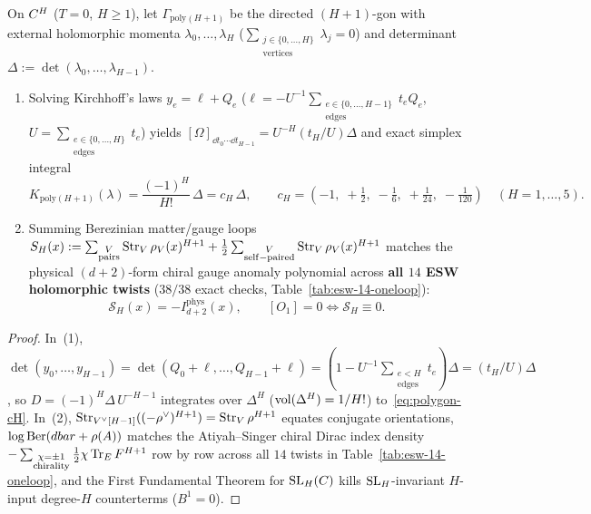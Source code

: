\begin{theorem}[Exact $(H+1)$-gon kernel and universal $14$-twist match $\mathcal{S}_H = -I^{\mathrm{phys}}_{d+2}$~{\cite{GW18,Repo9e833c8}}]
\label{thm:esw-oneloop}
On $C^H$ ($T = 0$, $H \ge 1$), let $\Gamma_{\mathrm{poly}(H+1)}$ be the directed $(H+1)$-gon with external holomorphic momenta $\lambda_0,\dots,\lambda_H$ ($\sum_{\substack{j\in\{0,\dots,H\}\\\mathrm{vertices}}}\lambda_j = 0$) and determinant $\Delta := \det(\lambda_0,\dots,\lambda_{H-1})$.
\begin{enumerate}[label=(\arabic*),leftmargin=*]
  \item Solving Kirchhoff's laws $y_e = \ell + Q_e$ ($\ell = -U^{-1}\sum_{\substack{e\in\{0,\dots,H-1\}\\\mathrm{edges}}}t_e Q_e$, $U = \sum_{\substack{e\in\{0,\dots,H\}\\\mathrm{edges}}}t_e$) yields $[\Omega]_{\dd t_0\cdots\dd t_{H-1}} = U^{-H}(t_H/U)\Delta$ and exact simplex integral
  \begin{equation}
  \label{eq:polygon-cH}
  K_{\mathrm{poly}(H+1)}(\lambda) = \frac{(-1)^H}{H!}\,\Delta = c_H\,\Delta,\qquad
  c_H = \left(-1,\; +\tfrac{1}{2},\; -\tfrac{1}{6},\; +\tfrac{1}{24},\; -\tfrac{1}{120}\right)\quad (H=1,\dots,5).
  \end{equation}
  \item Summing Berezinian matter/gauge loops $S_H(x) := \sum_{\substack{V\\\mathrm{pairs}}}\operatorname{Str}_V\rho_V(x)^{H+1} + \frac{1}{2}\sum_{\substack{V\\\mathrm{self-paired}}}\operatorname{Str}_V\rho_V(x)^{H+1}$ matches the physical $(d+2)$-form chiral gauge anomaly polynomial across \textbf{all $14$ ESW holomorphic twists} ($38/38$ exact checks, Table~\ref{tab:esw-14-oneloop}):
  \begin{equation}
  \label{eq:SH-equals-minus-Iphys}
  \mathcal{S}_H(x) = -I^{\mathrm{phys}}_{d+2}(x),\qquad
  [O_1] = 0 \iff \mathcal{S}_H \equiv 0.
  \end{equation}
\end{enumerate}
\end{theorem}

\begin{proof}
In~(1), $\det(y_0,\dots,y_{H-1}) = \det(Q_0+\ell,\dots,Q_{H-1}+\ell) = (1 - U^{-1}\sum_{\substack{e<H\\\mathrm{edges}}}t_e)\Delta = (t_H/U)\Delta$, so $D = (-1)^H\Delta\,U^{-H-1}$ integrates over $\Delta^H$ ($\operatorname{vol}(\Delta^H) = 1/H!$) to~\eqref{eq:polygon-cH}. In~(2), $\operatorname{Str}_{V^\vee[H-1]}((-\rho^{\vee})^{H+1}) = \operatorname{Str}_V\rho^{H+1}$ equates conjugate orientations, $\log\operatorname{Ber}(dbar + \rho(A))$ matches the Atiyah--Singer chiral Dirac index density $-\sum_{\substack{\chi=\pm 1\\\mathrm{chirality}}}\frac{1}{2}\chi\operatorname{Tr}_E F^{H+1}$ row by row across all $14$ twists in Table~\ref{tab:esw-14-oneloop}, and the First Fundamental Theorem for $\operatorname{SL}_H(C)$ kills $\operatorname{SL}_H$-invariant $H$-input degree-$H$ counterterms ($B^1 = 0$).
\end{proof}

